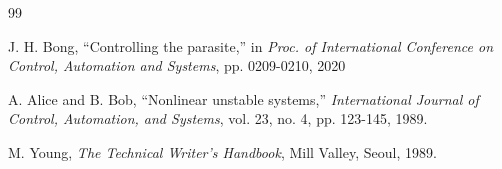\documentclass[10pt,twocolumn]{ICCAS}
\begin{document}
%
\begin{thebibliography}{99}

J. H. Bong, ``Controlling the parasite,'' in \textit{Proc. of International Conference on Control, Automation and Systems}, pp. 0209-0210, 2020


A. Alice and B. Bob, ``Nonlinear unstable systems,'' \textit{International Journal of Control, Automation, and Systems}, vol. 23, no. 4, pp. 123-145, 1989.

M. Young, \textit{The Technical Writer's Handbook}, Mill Valley, Seoul, 1989.



\end{thebibliography}
%
\end{document}
